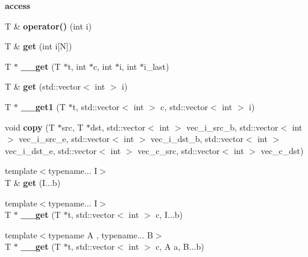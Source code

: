 \begin{Indent}{\bf access}\par
\begin{DoxyCompactItemize}
\item 
\hypertarget{class____array_a2640e620004e448f2c9d70e2d048c91e}{T \& {\bfseries operator()} (int i)}\label{class____array_a2640e620004e448f2c9d70e2d048c91e}

\item 
\hypertarget{class____array_ab8aa25dbb4bf56dd2df5dca22112deaf}{T \& {\bfseries get} (int i\mbox{[}N\mbox{]})}\label{class____array_ab8aa25dbb4bf56dd2df5dca22112deaf}

\item 
\hypertarget{class____array_a048dc1381c0a2e3b8b07d487b6e429b1}{T $\ast$ {\bfseries \-\_\-\-\_\-get} (T $\ast$t, int $\ast$c, int $\ast$i, int $\ast$i\-\_\-last)}\label{class____array_a048dc1381c0a2e3b8b07d487b6e429b1}

\item 
\hypertarget{class____array_ac7d5ddda5112a815aef1b8ac55fb3d87}{T \& {\bfseries get} (std\-::vector$<$ int $>$ i)}\label{class____array_ac7d5ddda5112a815aef1b8ac55fb3d87}

\item 
\hypertarget{class____array_a848bc4f4f32da2e95eecd3dd0e375a30}{T $\ast$ {\bfseries \-\_\-\-\_\-get1} (T $\ast$t, std\-::vector$<$ int $>$ c, std\-::vector$<$ int $>$ i)}\label{class____array_a848bc4f4f32da2e95eecd3dd0e375a30}

\item 
\hypertarget{class____array_a27570ec7189428efe483aba5c10de726}{void {\bfseries copy} (T $\ast$src, T $\ast$dst, std\-::vector$<$ int $>$ vec\-\_\-i\-\_\-src\-\_\-b, std\-::vector$<$ int $>$ vec\-\_\-i\-\_\-src\-\_\-e, std\-::vector$<$ int $>$ vec\-\_\-i\-\_\-dst\-\_\-b, std\-::vector$<$ int $>$ vec\-\_\-i\-\_\-dst\-\_\-e, std\-::vector$<$ int $>$ vec\-\_\-c\-\_\-src, std\-::vector$<$ int $>$ vec\-\_\-c\-\_\-dst)}\label{class____array_a27570ec7189428efe483aba5c10de726}

\item 
\hypertarget{class____array_a718b8009c814b7cfac99e4b36178cc87}{{\footnotesize template$<$typename... I$>$ }\\T \& {\bfseries get} (I...\-b)}\label{class____array_a718b8009c814b7cfac99e4b36178cc87}

\item 
\hypertarget{class____array_a90e1d2986c4dd2ce4368de7b35e7e041}{{\footnotesize template$<$typename... I$>$ }\\T $\ast$ {\bfseries \-\_\-\-\_\-get} (T $\ast$t, std\-::vector$<$ int $>$ c, I...\-b)}\label{class____array_a90e1d2986c4dd2ce4368de7b35e7e041}

\item 
\hypertarget{class____array_a9592a69b889f834b844232459d89edc9}{{\footnotesize template$<$typename A , typename... B$>$ }\\T $\ast$ {\bfseries \-\_\-\-\_\-get} (T $\ast$t, std\-::vector$<$ int $>$ c, A a, B...\-b)}\label{class____array_a9592a69b889f834b844232459d89edc9}

\end{DoxyCompactItemize}
\end{Indent}
